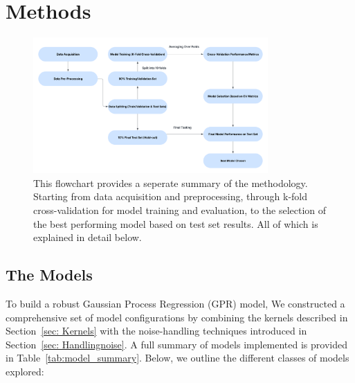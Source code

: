 \documentclass{ucdgradtaughtthesis}
\begin{document}
\chapter{Methods}
\begin{figure}[H]
    \centering
   \includegraphics[width=0.8\textwidth]{LatexPlots/Flowchart.png}
    \caption[Flow chart of the process taken from data processing to selecting the best performing model.]{
        This flowchart provides a seperate summary of the methodology. Starting from data acquisition and preprocessing, 
        through k-fold cross-validation for model training and evaluation, 
        to the selection of the best performing model based on test set results. All of which is explained in detail below.}
    \label{fig:flowchart}
\end{figure}
\section{The Models}
\label{subsec:Models}
To build a robust Gaussian Process Regression (GPR) model, We constructed a comprehensive set of model configurations by combining the kernels described in Section~\ref{sec: Kernels} with the noise-handling techniques introduced in Section~\ref{sec: Handlingnoise}. 
A full summary of models implemented is provided in Table~\ref{tab:model_summary}. Below, we outline the different classes of models explored:

\noindent
\end{document}
